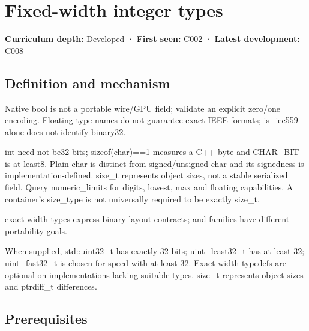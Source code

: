 \hypertarget{appendix-cc04044b5782}{}\label{referencestart:appendix-cc04044b5782}
\section{Fixed-width integer types}\label{appendix-cc04044b5782-fixed-width-integer-types}

\hypertarget{appendix-cc04044b5782-fixed-width-integer-types}{}

\textbf{Curriculum depth:} Developed · \textbf{First seen:} C002 · \textbf{Latest development:} C008

\begin{allmightroledefinition}

\subsection{Definition and mechanism}\label{appendix-cc04044b5782-definition-and-mechanism}

\hypertarget{appendix-cc04044b5782-definition-and-mechanism}{}

Native bool is not a portable wire/GPU field; validate an explicit zero/one encoding. Floating type names do not guarantee exact IEEE formats; is\_iec559 alone does not identify binary32.

\end{allmightroledefinition}

int need not be32 bits; sizeof(char)==1 measures a C++ byte and CHAR\_BIT is at least8. Plain char is distinct from signed/unsigned char and its signedness is implementation-defined. size\_t represents object sizes, not a stable serialized field. Query numeric\_limits for digits, lowest, max and floating capabilities. A container's size\_type is not universally required to be exactly size\_t.

 exact-width types express binary layout contracts;  and  families have different portability goals.

When supplied, std::uint32\_t has exactly 32 bits; uint\_least32\_t has at least 32; uint\_fast32\_t is chosen for speed with at least 32. Exact-width typedefs are optional on implementations lacking suitable types. size\_t represents object sizes and ptrdiff\_t differences.

\subsection{Prerequisites}\label{appendix-cc04044b5782-prerequisites}

